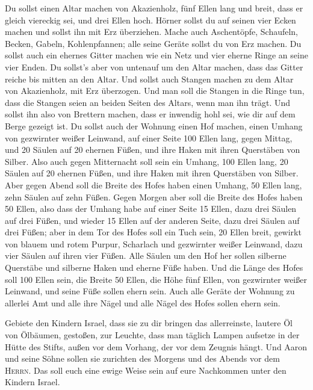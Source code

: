  Du sollst einen Altar machen von Akazienholz, fünf Ellen
lang und breit, dass er gleich viereckig sei, und drei Ellen hoch.
 Hörner sollst du auf seinen vier Ecken machen und sollst
ihn mit Erz überziehen.  Mache auch Aschentöpfe,
Schaufeln, Becken, Gabeln, Kohlenpfannen; alle seine Geräte sollst du
von Erz machen.  Du sollst auch ein ehernes Gitter machen
wie ein Netz und vier eherne Ringe an seine vier Enden. 
Du sollst's aber von untenauf um den Altar machen, dass das Gitter
reiche bis mitten an den Altar.  Und sollst auch Stangen
machen zu dem Altar von Akazienholz, mit Erz überzogen. 
Und man soll die Stangen in die Ringe tun, dass die Stangen seien an
beiden Seiten des Altars, wenn man ihn trägt.  Und sollst
ihn also von Brettern machen, dass er inwendig hohl sei, wie dir auf dem
Berge gezeigt ist.  Du sollst auch der Wohnung einen Hof
machen, einen Umhang von gezwirnter weißer Leinwand, auf einer Seite 100
Ellen lang, gegen Mittag,  und 20 Säulen auf 20 ehernen
Füßen, und ihre Haken mit ihren Querstäben von Silber. 
Also auch gegen Mitternacht soll sein ein Umhang, 100 Ellen lang, 20
Säulen auf 20 ehernen Füßen, und ihre Haken mit ihren Querstäben von
Silber.  Aber gegen Abend soll die Breite des Hofes haben
einen Umhang, 50 Ellen lang, zehn Säulen auf zehn Füßen. 
Gegen Morgen aber soll die Breite des Hofes haben 50 Ellen,
 also dass der Umhang habe auf einer Seite 15 Ellen, dazu
drei Säulen auf drei Füßen,  und wieder 15 Ellen auf der
anderen Seite, dazu drei Säulen auf drei Füßen;  aber in
dem Tor des Hofes soll ein Tuch sein, 20 Ellen breit, gewirkt von blauem
und rotem Purpur, Scharlach und gezwirnter weißer Leinwand, dazu vier
Säulen auf ihren vier Füßen.  Alle Säulen um den Hof her
sollen silberne Querstäbe und silberne Haken und eherne Füße haben.
 Und die Länge des Hofes soll 100 Ellen sein, die Breite
50 Ellen, die Höhe fünf Ellen, von gezwirnter weißer Leinwand, und seine
Füße sollen ehern sein.  Auch alle Geräte der Wohnung zu
allerlei Amt und alle ihre Nägel und alle Nägel des Hofes sollen ehern
sein.

 Gebiete den Kindern Israel, dass sie zu dir bringen das
allerreinste, lautere Öl von Ölbäumen, gestoßen, zur Leuchte, dass man
täglich Lampen aufsetze  in der Hütte des Stifts, außen
vor dem Vorhang, der vor dem Zeugnis hängt. Und Aaron und seine Söhne
sollen sie zurichten des Morgens und des Abends vor dem \textsc{Herrn}.
Das soll euch eine ewige Weise sein auf eure Nachkommen unter den
Kindern Israel.

